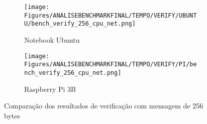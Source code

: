 \begin{figure}[h!]
    \centering
    \begin{subfigure}{1\textwidth}
        \texttt{[image: Figures/ANALISEBENCHMARKFINAL/TEMPO/VERIFY/UBUNTU/bench\_verify\_256\_cpu\_net.png]}
        \caption{Notebook Ubuntu}
    \end{subfigure}
    \par\vspace{1em}
    \begin{subfigure}{1\textwidth}
        \texttt{[image: Figures/ANALISEBENCHMARKFINAL/TEMPO/VERIFY/PI/bench\_verify\_256\_cpu\_net.png]}
        \caption{Raspberry Pi 3B}
    \end{subfigure}
    \caption{Comparação dos resultados de verificação com mensagem de 256 bytes}
    \label{fig:BENCHFINAL_VERIFY256_TIME}
\end{figure}

